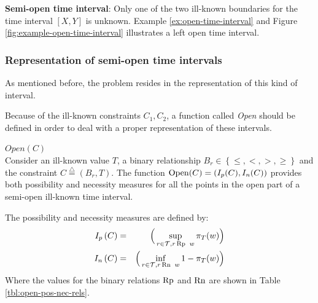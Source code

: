 \begin{definition}
\textbf{Semi-open time interval}: Only one of the two ill-known boundaries for the time interval $\left[X, Y\right]$ is unknown. Example \ref{ex:open-time-interval} and Figure \ref{fig:example-open-time-interval} illustrates a left open time interval.
\end{definition}

\subsubsection{\label{subsubsec:representation-semi-open}Representation of semi-open time intervals}
As mentioned before, the problem resides in the representation of this kind of interval. 


Because of the ill-known constraints $C_{1}, C_{2}$, a function called \emph{Open} should be defined in order to deal with a proper representation of these intervals.

\begin{definition}
\label{def:open-func}
$Open(C)$\\
Consider an ill-known value $T$, a binary relationship $B_r \in \left \lbrace \leq, <, >, \geq\right \rbrace$ and the constraint $C\stackrel{\triangle}{=}\left(B_r,T\right)$.
The function $\operatorname{Open}(C) = \left(I_p(C), I_n(C) \right)$ provides both possibility and necessity measures for all the points in the open part of a semi-open ill-known time interval.

The possibility and necessity measures are defined by:
\begin{eqnarray}
\label{eq:open-pos-nec}
I_p \left(C \right) &=& \Big(\sup_{r\in\mathcal{T}, r \operatorname{Rp}\  w}\pi_{T}(w)\Big)\\
I_n \left(C \right) &=& \Big(\inf_{r\in\mathcal{T}, r \operatorname{Rn}\  w}1-\pi_{T}(w)\Big)
\end{eqnarray}
Where the values for the binary relations $\operatorname{Rp}$ and $\operatorname{Rn}$ are shown in Table \ref{tbl:open-pos-nec-rels}.
\end{definition} 

